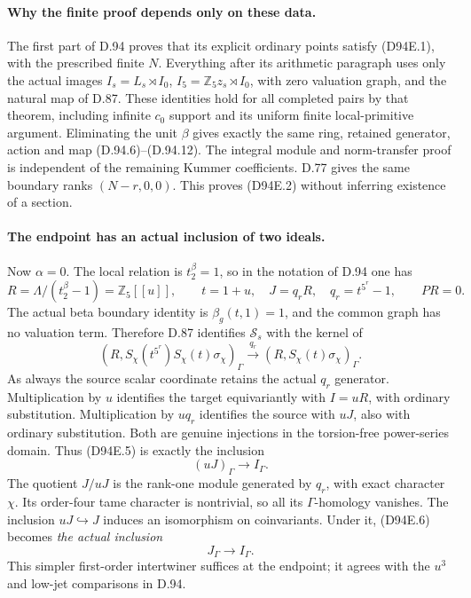 \paragraph{Why the finite proof depends only on these data.}
The first part of D.94 proves that its explicit ordinary
points satisfy (D94E.1), with the prescribed finite \(N\).
Everything after its arithmetic paragraph uses only the
actual images
\(I_s=L_s\rtimes I_0\), \(I_5=\mathbb Z_5z_s\rtimes I_0\),
with zero valuation graph, and the natural map of D.87.
These identities hold for all completed pairs by that theorem,
including infinite \(c_0\) support and its uniform finite
local-primitive argument. Eliminating the unit \(\beta\)
gives exactly the same ring, retained generator, action and
map (D.94.6)--(D.94.12). The integral module and norm-transfer
proof is independent of the remaining Kummer coefficients.
D.77 gives the same boundary ranks \((N-r,0,0)\).
This proves (D94E.2) without inferring existence of a section.

\paragraph{The endpoint has an actual inclusion of two ideals.}
Now \(\alpha=0\). The local relation is \(t_2^\beta=1\),
so in the notation of D.94 one has
\[
 R=\Lambda/(t_2^\beta-1)=\mathbb Z_5[[u]],\qquad
       t=1+u,\quad J=q_rR,\quad q_r=t^{5^r}-1,
       \qquad PR=0.                                    \tag{D94E.4}
\]
The actual beta boundary identity is \(\beta_g(t,1)=1\),
and the common graph has no valuation term. Therefore
D.87 identifies \(\mathcal S_s\) with the kernel of
\[
 \left(R,S_\chi(t^{5^r})S_\chi(t)\sigma_\chi\right)_\Gamma
       \xrightarrow{\;q_r\;}
 \left(R,S_\chi(t)\sigma_\chi\right)_\Gamma.
                                                        \tag{D94E.5}
\]
As always the source scalar coordinate retains the actual
\(q_r\) generator. Multiplication by \(u\) identifies the
target equivariantly with \(I=uR\), with ordinary substitution.
Multiplication by \(u q_r\) identifies the source with
\(uJ\), also with ordinary substitution. Both are genuine
injections in the torsion-free power-series domain. Thus
(D94E.5) is exactly the inclusion
\[
                         (uJ)_\Gamma\longrightarrow I_\Gamma.
                                                        \tag{D94E.6}
\]
The quotient \(J/uJ\) is the rank-one module generated by
\(q_r\), with exact character \(\chi\). Its order-four
tame character is nontrivial, so all its \(\Gamma\)-homology
vanishes. The inclusion \(uJ\hookrightarrow J\) induces an
isomorphism on coinvariants. Under it, (D94E.6) becomes
\emph{the actual inclusion}
\[
                              J_\Gamma\longrightarrow I_\Gamma.
                                                        \tag{D94E.7}
\]
This simpler first-order intertwiner suffices at the endpoint;
it agrees with the \(u^3\) and low-jet comparisons in D.94.

